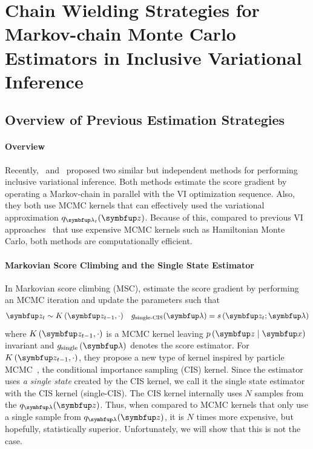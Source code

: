 
\section{Chain Wielding Strategies for Markov-chain Monte Carlo Estimators in Inclusive Variational Inference}
\vspace{-0.05in}
\subsection{Overview of Previous Estimation Strategies}\label{section:jsa_msc}
%
\vspace{-0.05in}

\paragraph{Overview}
Recently,~\citeauthor{NEURIPS2020_b2070693} and~\citeauthor{pmlr-v124-ou20a} proposed two similar but independent methods for performing inclusive variational inference.
Both methods estimate the score gradient by operating a Markov-chain in parallel with the VI optimization sequence.
Also, they both use MCMC kernels that can effectively used the variational approximation \(q_{\vlambda_t}(\vz)\).
Because of this, compared to previous VI approaches~\citep{pmlr-v97-ruiz19a, pmlr-v70-hoffman17a} that use expensive MCMC kernels such as Hamiltonian Monte Carlo, both methods are computationally efficient. 

\vspace{-0.05in}
\paragraph{Markovian Score Climbing and the Single State Estimator}
In Markovian score climbing (MSC), \citep{NEURIPS2020_b2070693} estimate the score gradient by performing an MCMC iteration and update the parameters such that
\vspace{-0.05in}
\begin{align}
  &\vz_t \sim K\left(\vz_{t-1}, \cdot \right) &g_{\text{single-CIS}}(\vlambda) = s\,(\vz_t; \vlambda)
\end{align}
where \(K\left(\vz_{t-1}, \cdot\right)\) is a MCMC kernel leaving \(p\,(\vz\mid\vx)\) invariant and \(g_{\text{single}}\left(\vlambda\right)\) denotes the score estimator.
For \(K\left(\vz_{t-1}, \cdot\right)\), they propose a new type of kernel inspired by particle MCMC~\cite{andrieu_particle_2010}, the conditional importance sampling (CIS) kernel.
Since the estimator uses \textit{a single state} created by the CIS kernel, we call it the single state estimator with the CIS kernel (single-CIS).
The CIS kernel internally uses \(N\) samples from the \(q_{\vlambda}(\vz)\).
Thus, when compared to MCMC kernels that only use a single sample from \(q_{\vlambda}(\vz)\), it is \(N\) times more expensive, but hopefully, statistically superior.
Unfortunately, we will show that this is not the case.

